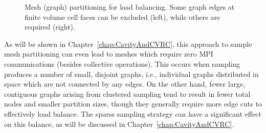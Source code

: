 \begin{figure}
\begin{minipage}{0.45\linewidth}
    \end{minipage}
    \caption{\label{fig:edgeCuts}Mesh (graph) partitioning for load balancing. Some graph edges at finite volume cell faces can be excluded (left), while others are required (right).}
\end{figure}

As will be shown in Chapter~\ref{chap:CavityAndCVRC}, this approach to sample mesh partitioning can even lead to meshes which require zero MPI communications (besides collective operations). This occurs when sampling produces a number of small, disjoint graphs, i.e., individual graphs distributed in space which are not connected by any edges. On the other hand, fewer large, contiguous graphs arising from clustered sampling tend to result in fewer total nodes and smaller partition sizes, though they generally require more edge cuts to effectively load balance. The sparse sampling strategy can have a significant effect on this balance, as will be discussed in Chapter~\ref{chap:CavityAndCVRC}.
